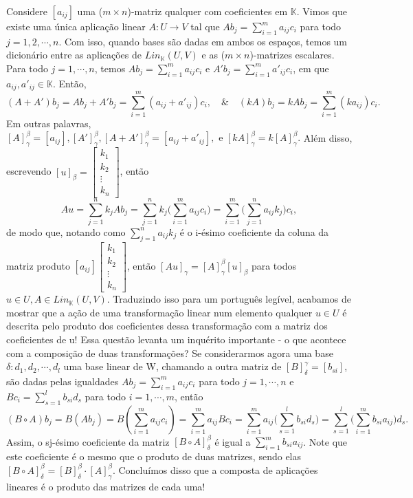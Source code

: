 \documentclass{article}
\newcommand{\Lin}[1]{Lin_{\mathbb{K}}({#1})}
\begin{document}
Considere $[a_{ij}]$ uma ($m\times{n}$)-matriz qualquer com coeficientes em $\mathbb{K}$. Vimos que existe uma
\'unica aplica\c c\~ao linear $A:U\rightarrow{V}$ tal que $Ab_j = \sum\limits_{i=1}^{m}a_{ij}c_i$ para todo $j = 1,
	2, \cdots, n$. Com isso, quando bases s\~ao dadas em ambos os espa\c cos, temos um dicion\'ario entre as aplica\c c\~oes
de $\Lin{U, V}$ e as ($m\times{n}$)-matrizes escalares. Para todo $j = 1, \cdots, n$, temos
$Ab_j = \sum\limits_{i=1}^{m}a_{ij}c_{i}$ e $A'b_j = \sum\limits_{i=1}^{m}a'_{ij}c_{i}$, em que
$a_{ij}, a'_{ij}\in\mathbb{K}.$ Ent\~ao,
$$
	(A + A')b_j = Ab_j + A'b_j = \sum_{i=1}^{m}(a_{ij} + a'_{ij})c_{i}, \quad \text{\&} \quad
	(kA)b_j = kAb_j = \sum\limits_{i=1}^{m}(ka_{ij})c_{i}.
$$
Em outras palavras, $[A]^\beta_\gamma = [a_{ij}], [A']_\gamma^\beta, [A + A']^\beta_\gamma = [a_{ij} + a'_{ij}],
	\text{ e } [kA]_\gamma^\beta = k[A]_\gamma^\beta.$
Al\'em disso, escrevendo $[u]_\beta = \begin{bmatrix} k_{1} \\ k_{2} \\ \vdots \\ k_{n} \end{bmatrix} $,
ent\~ao
$$
	Au = \sum_{j=1}^{n}k_jAb_j = \sum_{j=1}^{n}k_j\biggl(\sum_{i=1}^{m}a_{ij}c_{i}\biggr)
	= \sum_{i=1}^{m}\biggl(\sum_{j=1}^{n}a_{ij}k_j\biggr)c_{i},
$$
de modo que, notando como $\sum\limits_{j=1}^{n}a_{ij}k_j$ \'e o i-\'esimo coeficiente da coluna da matriz
produto $[a_{ij}]\begin{bmatrix} k_{1} \\ k_{2} \\ \vdots \\ k_{n} \end{bmatrix}$, ent\~ao
$[Au]_\gamma = [A]_\gamma^\beta[u]_\beta$ para todos $u\in{U}, A\in{\Lin{U, V}}$. Traduzindo isso para
um portugu\^es leg\'ivel, acabamos de mostrar que a a\c c\~ao de uma transforma\c c\~ao linear num elemento
qualquer $u\in{U}$ \'e descrita pelo produto dos coeficientes dessa transforma\c c\~ao com a matriz dos coeficientes
de u!
Essa quest\~ao levanta um inqu\'erito importante - o que acontece com a composi\c c\~ao de duas transforma\c c\~oes?
Se considerarmos agora uma base $\delta: d_1, d_2, \cdots, d_l$ uma base linear de W, chamando a outra matriz de
$[B]_\delta^\gamma = [b_{si}]$, s\~ao dadas pelas igualdades $Ab_j = \sum\limits_{i=1}^{m}a_{ij}c_{i}$ para todo
$j = 1, \cdots, n$ e $Bc_i = \sum\limits_{s=1}^{l}b_{si}d_{s}$ para todo $i = 1, \cdots, m$, ent\~ao
$$
	(B\circ{A})b_j = B(Ab_j) = B(\sum_{i=1}^{m}a_{ij}c_{i}) = \sum_{i=1}^{m}a_{ij}Bc_i = \sum_{i=1}^{m}a_{ij}
	\biggl(\sum_{s=1}^{l}b_{si}d_s\biggr) = \sum_{s=1}^{l}\biggl(\sum_{i=1}^{m}b_{si}a_{ij}\biggr)d_s.
$$
Assim, o sj-\'esimo coeficiente da matriz $[B\circ{A}]_{\delta}^{\beta}$ \'e igual a $\sum\limits_{i=1}^{m}
	b_{si}a_{ij}$. Note que este coeficiente \'e o mesmo que o produto de duas matrizes, sendo elas
$[B\circ{A}]_{\delta}^{\beta} = [B]_{\delta}^{\beta}\cdot[A]_{\gamma}^{\beta}.$ Conclu\'imos disso que
a composta de aplica\c c\~oes lineares \'e o produto das matrizes de cada uma!
\end{document}
